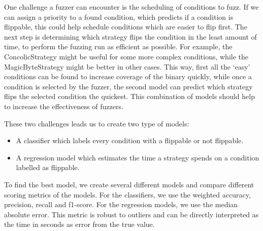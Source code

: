 One challenge a fuzzer can encounter is the scheduling of conditions to fuzz. If we can assign a priority to a found condition, which predicts if a condition is flippable, this could help schedule conditions which are easier to flip first.
The next step is determining which strategy flips the condition in the least amount of time, to perform the fuzzing run as efficient as possible.
For example, the ConcolicStrategy might be useful for some more complex conditions, while the MagicByteStrategy might be better in other cases. %
This way, first all the `easy' conditions can be found to increase coverage of the binary quickly, while once a condition is selected by the fuzzer, the second model can predict which strategy flips the selected condition the quickest.
This combination of models should help to increase the effectiveness of fuzzers.

These two challenges leads us to create two type of models:
\begin{itemize}
    \item A classifier which labels every condition with a flippable or not flippable.
    \item A regression model which estimates the time a strategy spends on a condition labelled as flippable.
\end{itemize}

To find the best model, we create several different models and compare different scoring metrics of the models. For the classifiers, we use the weighted accuracy, precision, recall and f1-score. For the regression models, we use the median absolute error. This metric is robust to outliers and can be directly interpreted as the time in seconds as error from the true value.